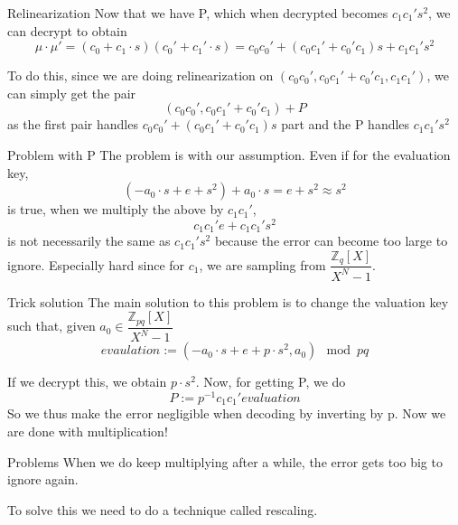 \documentclass{beamer}
\begin{document}
	\begin{frame}{Relinearization}
		Now that we have P, which when decrypted becomes $c_1c_1's^2$, we can decrypt to obtain
		\begin{equation*}
			\mu\cdot \mu' = (c_0+c_1\cdot s)(c_0'+c_1'\cdot s)=c_0c_0'+(c_0c_1'+c_0'c_1)s+c_1c_1's^2
		\end{equation*}
		
		To do this, since we are doing relinearization on $(c_0c_0', c_0c_1'+c_0'c_1, c_1c_1')$, we can simply get the pair
		\begin{equation*}
			(c_0c_0', c_0c_1'+c_0'c_1)+P
		\end{equation*}
		as the first pair handles $c_0c_0'+(c_0c_1'+c_0'c_1)s$ part and the P handles $c_1c_1's^2$
	\end{frame}
	\begin{frame}{Problem with P}
		The problem is with our assumption. Even if for the evaluation key,
		\begin{equation*}
			(-a_0\cdot s+e+s^2)+a_0\cdot s = e+s^2 \approx s^2
		\end{equation*}
		is true, when we multiply the above by $c_1c_1'$, 
		\begin{equation*}
			c_1c_1'e+c_1c_1's^2 
		\end{equation*}
		is not necessarily the same as $c_1c_1's^2$ because the error can become too large to ignore. Especially hard since for $c_1$, we are sampling from $\dfrac{\mathbb{Z}_q[X]}{X^N-1}$.
	\end{frame}
	\begin{frame}{Trick solution}
		The main solution to this problem is to change the valuation key such that, given $a_0 \in \dfrac{\mathbb{Z}_{pq}[X]}{X^N-1}$
		\begin{equation*}
			evaulation := (-a_0\cdot s+e+p\cdot s^2, a_0) \mod pq
		\end{equation*}
		
		If we decrypt this, we obtain $p\cdot s^2$. Now, for getting P, we do
		\begin{equation*}
			P:= p^{-1}c_1c_1'evaluation
		\end{equation*}
		So we thus make the error negligible when decoding by inverting by p.
		Now we are done with multiplication!
	\end{frame}
	\begin{frame}{Problems}
		When we do keep multiplying after a while, the error gets too big to ignore again.
		
		To solve this we need to do a technique called rescaling.
		
	\end{frame}
\end{document}
